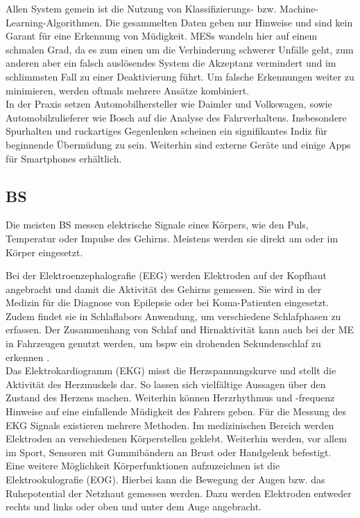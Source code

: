 {Allen System gemein ist die Nutzung von Klassifizierungs- bzw. Machine-Learning-Algorithmen. Die gesammelten Daten geben nur Hinweise und sind kein Garant für eine Erkennung von Müdigkeit. \acl{MESs} wandeln hier auf einem schmalen Grad, da es zum einen um die Verhinderung schwerer Unfälle geht, zum anderen aber ein falsch auslösendes System die Akzeptanz vermindert und im schlimmsten Fall zu einer Deaktivierung führt. Um falsche Erkennungen weiter zu minimieren, werden oftmals mehrere Ansätze kombiniert.\\

In der Praxis setzen Automobilhersteller wie Daimler \cite{Daimler} und Volkswagen, sowie Automobilzulieferer wie Bosch \cite{Bosch} auf die Analyse des Fahrverhaltens. Insbesondere Spurhalten und ruckartiges Gegenlenken scheinen ein signifikantes Indiz für beginnende Übermüdung zu sein. Weiterhin sind externe Geräte und einige Apps für Smartphones erhältlich.

\subsection{\acl{BS}}
Die meisten \acl{BS} messen elektrische Signale eines Körpers, wie den Puls, Temperatur oder Impulse des Gehirns. Meistens werden sie direkt am oder im Körper eingesetzt.

Bei der Elektroenzephalografie (EEG) werden Elektroden auf der Kopfhaut angebracht und damit die Aktivität des Gehirns gemessen. Sie wird in der Medizin für die Diagnose von Epilepsie oder bei Koma-Patienten eingesetzt. Zudem findet sie in Schlaflabors Anwendung, um verschiedene Schlafphasen zu erfassen. Der Zusammenhang von Schlaf und Hirnaktivität kann auch bei der \acl{ME} in Fahrzeugen genutzt werden, um \acl{bspw} ein drohenden Sekundenschlaf zu erkennen \cite{Santamaria_eeg}. \\

Das Elektrokardiogramm (EKG) misst die Herzspannungskurve und stellt die Aktivität des Herzmuskels dar. So lassen sich vielfältige Aussagen über den Zustand des Herzens machen. Weiterhin können Herzrhythmus und -frequenz Hinweise auf eine einfallende Müdigkeit des Fahrers geben. Für die Messung des EKG Signals existieren mehrere Methoden. Im medizinischen Bereich werden Elektroden an verschiedenen Körperstellen geklebt. Weiterhin werden, vor allem im Sport, Sensoren mit Gummibändern an Brust oder Handgelenk befestigt. \\

Eine weitere Möglichkeit Körperfunktionen aufzuzeichnen ist die Elektrookulografie (EOG). Hierbei kann die Bewegung der Augen bzw. das Ruhepotential der Netzhaut gemessen werden. Dazu werden Elektroden entweder rechts und links oder oben und unter dem Auge angebracht.\\

}
